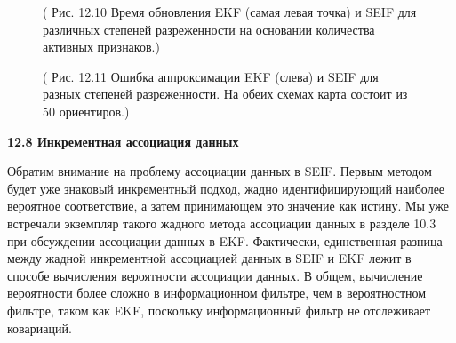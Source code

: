 \documentclass[10pt,a4paper]{article}
\begin{document}
\begin{figure}[H]
	\caption{ ( Рис. 12.10  Время обновления EKF (самая левая точка) и SEIF для различных степеней разреженности на основании количества активных признаков.) }
	\label{fig:1210orig}
\end{figure}

\begin{figure}[H]
	\caption{ ( Рис. 12.11 Ошибка аппроксимации EKF (слева) и SEIF для разных степеней разреженности. На обеих схемах карта состоит из 50 ориентиров.) }
	\label{fig:1211orig}
\end{figure}

\textbf{12.8	Инкрементная ассоциация данных}

Обратим внимание на проблему ассоциации данных в SEIF. Первым методом будет уже знаковый инкрементный подход, жадно идентифицирующий наиболее вероятное соответствие, а затем принимающем это значение как истину. Мы уже встречали экземпляр такого жадного метода ассоциации данных в разделе 10.3 при обсуждении ассоциации данных в EKF. Фактически, единственная разница между жадной инкрементной ассоциацией данных в SEIF и EKF лежит в способе вычисления вероятности ассоциации данных. В общем, вычисление вероятности более сложно в информационном фильтре, чем в вероятностном фильтре, таком как EKF, поскольку информационный фильтр не отслеживает ковариаций.\\
\end{document}
